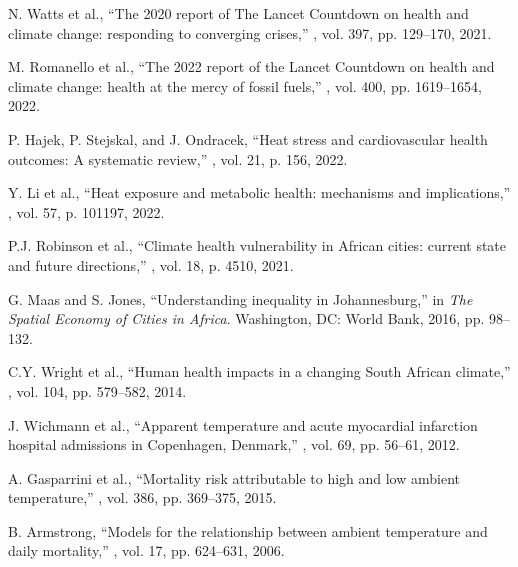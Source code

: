 \documentclass[11pt,a4paper]{article}
\begin{document}

\begin{thebibliography}{99}

N. Watts et al.,
\newblock ``The 2020 report of The Lancet Countdown on health and climate change: responding to converging crises,''
, vol. 397, pp. 129--170, 2021.

M. Romanello et al.,
\newblock ``The 2022 report of the Lancet Countdown on health and climate change: health at the mercy of fossil fuels,''
, vol. 400, pp. 1619--1654, 2022.

P. Hajek, P. Stejskal, and J. Ondracek,
\newblock ``Heat stress and cardiovascular health outcomes: A systematic review,''
, vol. 21, p. 156, 2022.

Y. Li et al.,
\newblock ``Heat exposure and metabolic health: mechanisms and implications,''
, vol. 57, p. 101197, 2022.

P.J. Robinson et al.,
\newblock ``Climate health vulnerability in African cities: current state and future directions,''
, vol. 18, p. 4510, 2021.

G. Maas and S. Jones,
\newblock ``Understanding inequality in Johannesburg,'' in {\em The Spatial Economy of Cities in Africa}.
\newblock Washington, DC: World Bank, 2016, pp. 98--132.

C.Y. Wright et al.,
\newblock ``Human health impacts in a changing South African climate,''
, vol. 104, pp. 579--582, 2014.

J. Wichmann et al.,
\newblock ``Apparent temperature and acute myocardial infarction hospital admissions in Copenhagen, Denmark,''
, vol. 69, pp. 56--61, 2012.

A. Gasparrini et al.,
\newblock ``Mortality risk attributable to high and low ambient temperature,''
, vol. 386, pp. 369--375, 2015.

B. Armstrong,
\newblock ``Models for the relationship between ambient temperature and daily mortality,''
, vol. 17, pp. 624--631, 2006.


\end{thebibliography}
\end{document}
